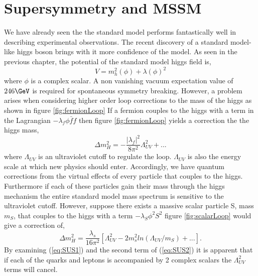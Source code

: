 \chapter{Supersymmetry and MSSM}

We have already seen the the standard model 
performs fantastically well in describing experimental observations. The
recent discovery of a standard model-like higgs boson brings with it
more confidence of the model. 
As seen in the previous chapter, the potential of the standard model higgs 
field is,
\begin{equation}
V=m_{h}^{2}(\phi)+\lambda(\phi)^{2}
\end{equation}
where $\phi$ is a complex scalar.
A non vanishing vacuum expectation 
value of $246 \GeV$ is required for spontaneous symmetry breaking.
However, a problem arises when 
considering higher order loop corrections to the mass of the higgs as shown in
figure \ref{fig:fermionLoop} 
If a fermion couples to the higgs with a term in the Lagrangian $-\lambda_{f}\phi \bar{f}f$
then figure \ref{fig:fermionLoop} 
yields a correction the the higgs mass,
\begin{equation}
\Delta m_{H}^{2}=-\frac{|\lambda_{f}|^{2}}{8\pi^{2}}\Lambda_{UV}^{2}+...
\label{eq:SUS1}
\end{equation}
where $\Lambda_{UV}$ is an ultraviolet cutoff to regulate the loop. $\Lambda_{UV}$
is also the energy scale at which new physics should enter.
Accordingly, we have quantum corrections from the virtual 
effects of every particle that couples to the higgs. Furthermore if each of these 
particles gain their mass through the higgs mechanism the entire standard model 
mass spectrum is sensitive to the ultraviolet cutoff.
However, suppose there exists a massive scalar particle S, mass $m_{S}$, that couples
to the higgs with a term $-\lambda_{S}\phi^{2} S^{2}$
figure \ref{fig:scalarLoop} would give a correction of,
\begin{equation}
\Delta m_{H}^{2}=\frac{\lambda_{s}}{16\pi^{2}}\left[\Lambda_{UV}^{2}-2m_{s}^{2}ln(\Lambda_{UV}/m_{S})+... \right].
\label{eq:SUS2}
\end{equation}
By examining (\ref{eq:SUS1}) and the second term of (\ref{eq:SUS2}) it is apparent that if each of the quarks
and leptons is accompanied by 2 complex scalars the $\Lambda_{UV}^{2}$ terms will cancel.

